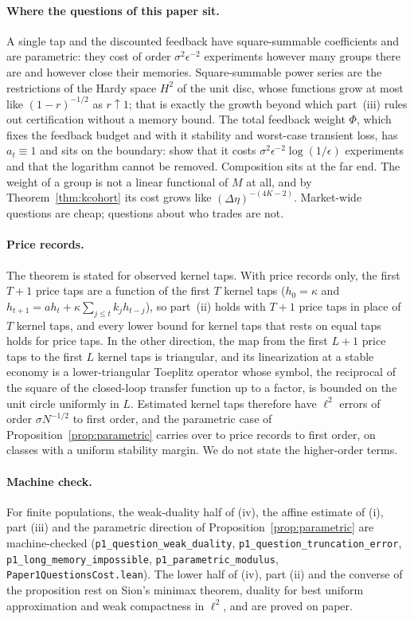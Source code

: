 \documentclass[12pt]{article}
\theoremstyle{definition}
\theoremstyle{remark}
\begin{document}
\paragraph{Where the questions of this paper sit.} A single tap and the discounted feedback have square-summable coefficients and are parametric: they cost of order $\sigma^2\epsilon^{-2}$ experiments however many groups there are and however close their memories. Square-summable power series are the restrictions of the Hardy space $H^2$ of the unit disc, whose functions grow at most like $(1-r)^{-1/2}$ as $r\uparrow1$; that is exactly the growth beyond which part~(iii) rules out certification without a memory bound. The total feedback weight $\Phi$, which fixes the feedback budget and with it stability and worst-case transient loss, has $a_t\equiv1$ and sits on the boundary: \citet{niroula2026b} show that it costs $\sigma^2\epsilon^{-2}\log(1/\epsilon)$ experiments and that the logarithm cannot be removed. Composition sits at the far end. The weight of a group is not a linear functional of $M$ at all, and by Theorem~\ref{thm:kcohort} its cost grows like $(\Delta\eta)^{-(4K-2)}$. Market-wide questions are cheap; questions about who trades are not.

\paragraph{Price records.} The theorem is stated for observed kernel taps. With price records only, the first $T+1$ price taps are a function of the first $T$ kernel taps ($h_0=\kappa$ and $h_{t+1}=ah_t+\kappa\sum_{j\le t}k_jh_{t-j}$), so part~(ii) holds with $T+1$ price taps in place of $T$ kernel taps, and every lower bound for kernel taps that rests on equal taps holds for price taps. In the other direction, the map from the first $L+1$ price taps to the first $L$ kernel taps is triangular, and its linearization at a stable economy is a lower-triangular Toeplitz operator whose symbol, the reciprocal of the square of the closed-loop transfer function up to a factor, is bounded on the unit circle uniformly in $L$. Estimated kernel taps therefore have $\ell^2$ errors of order $\sigma N^{-1/2}$ to first order, and the parametric case of Proposition~\ref{prop:parametric} carries over to price records to first order, on classes with a uniform stability margin. We do not state the higher-order terms.

\paragraph{Machine check.} For finite populations, the weak-duality half of (iv), the affine estimate of (i), part (iii) and the parametric direction of Proposition~\ref{prop:parametric} are machine-checked (\texttt{p1\_question\_weak\_duality}, \texttt{p1\_question\_truncation\_error}, \texttt{p1\_long\_memory\_impossible}, \texttt{p1\_parametric\_modulus}, \nolinkurl{Paper1QuestionsCost.lean}). The lower half of (iv), part (ii) and the converse of the proposition rest on Sion's minimax theorem, duality for best uniform approximation and weak compactness in $\ell^2$, and are proved on paper.
\end{document}
